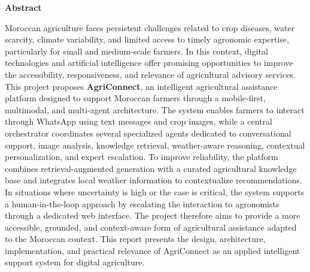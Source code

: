 \clearpage
\thispagestyle{plain}
\vspace*{1.5cm}
{\centering\Large\bfseries Abstract\par}
\vspace{1.5cm}

Moroccan agriculture faces persistent challenges related to crop diseases, water scarcity, climate variability, and limited access to timely agronomic expertise, particularly for small and medium-scale farmers. In this context, digital technologies and artificial intelligence offer promising opportunities to improve the accessibility, responsiveness, and relevance of agricultural advisory services. This project proposes \textbf{AgriConnect}, an intelligent agricultural assistance platform designed to support Moroccan farmers through a mobile-first, multimodal, and multi-agent architecture. The system enables farmers to interact through WhatsApp using text messages and crop images, while a central orchestrator coordinates several specialized agents dedicated to conversational support, image analysis, knowledge retrieval, weather-aware reasoning, contextual personalization, and expert escalation. To improve reliability, the platform combines retrieval-augmented generation with a curated agricultural knowledge base and integrates local weather information to contextualize recommendations. In situations where uncertainty is high or the case is critical, the system supports a human-in-the-loop approach by escalating the interaction to agronomists through a dedicated web interface. The project therefore aims to provide a more accessible, grounded, and context-aware form of agricultural assistance adapted to the Moroccan context. This report presents the design, architecture, implementation, and practical relevance of AgriConnect as an applied intelligent support system for digital agriculture.
